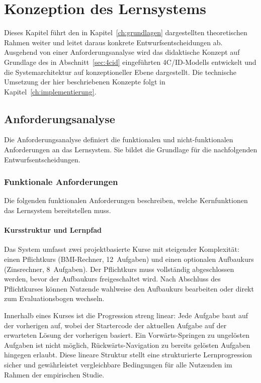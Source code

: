 \chapter{\textbf{Konzeption des Lernsystems}}\label{ch:konzeption}

Dieses Kapitel führt den in Kapitel~\ref{ch:grundlagen} dargestellten theoretischen Rahmen weiter und leitet daraus konkrete Entwurfsentscheidungen ab.
Ausgehend von einer Anforderungsanalyse wird das didaktische Konzept auf Grundlage des in Abschnitt~\ref{sec:4cid} eingeführten 4C/ID-Modells entwickelt und die Systemarchitektur auf konzeptioneller Ebene dargestellt.
Die technische Umsetzung der hier beschriebenen Konzepte folgt in Kapitel~\ref{ch:implementierung}.


\section{Anforderungsanalyse}\label{sec:anforderungen}

Die Anforderungsanalyse definiert die funktionalen und nicht-funktionalen Anforderungen an das Lernsystem.
Sie bildet die Grundlage für die nachfolgenden Entwurfsentscheidungen.

\subsection{Funktionale Anforderungen}\label{subsec:funktional}

Die folgenden funktionalen Anforderungen beschreiben, welche Kernfunktionen das Lernsystem bereitstellen muss.

\subsubsection{Kursstruktur und Lernpfad}

Das System umfasst zwei projektbasierte Kurse mit steigender Komplexität: einen Pflichtkurs (BMI-Rechner, 12~Aufgaben) und einen optionalen Aufbaukurs (Zinsrechner, 8~Aufgaben).
Der Pflichtkurs muss vollständig abgeschlossen werden, bevor der Aufbaukurs freigeschaltet wird.
Nach Abschluss des Pflichtkurses können Nutzende wahlweise den Aufbaukurs bearbeiten oder direkt zum Evaluationsbogen wechseln.

Innerhalb eines Kurses ist die Progression streng linear: Jede Aufgabe baut auf der vorherigen auf, wobei der Startercode der aktuellen Aufgabe auf der erwarteten Lösung der vorherigen basiert.
Ein Vorwärts-Springen zu ungelösten Aufgaben ist nicht möglich, Rückwärts-Navigation zu bereits gelösten Aufgaben hingegen erlaubt.
Diese lineare Struktur stellt eine strukturierte Lernprogression sicher und gewährleistet vergleichbare Bedingungen für alle Nutzenden im Rahmen der empirischen Studie.


